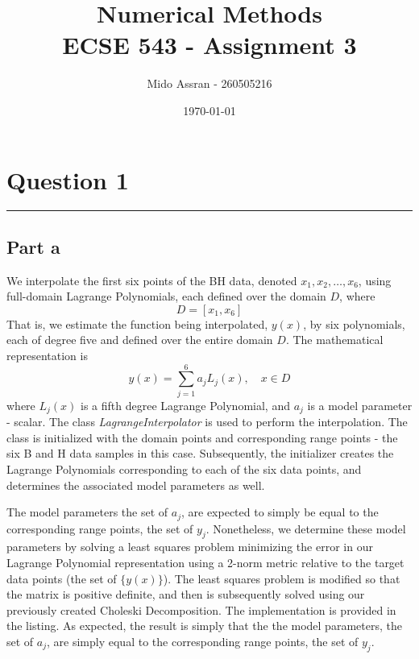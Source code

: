 \documentclass[11pt]{article}
\title{Numerical Methods\\[0.1in] ECSE 543 - Assignment 3}
\author{Mido Assran - 260505216}
\date{\today}
\begin{document}
\maketitle

\section*{Question 1}
\vspace*{-0.1in}
\noindent\rule{\textwidth}{0.4pt}

\subsection*{Part a}
We interpolate the first six points of the BH data, denoted $x_1, x_2, \ldots, x_6$, using full-domain Lagrange Polynomials, each defined over the domain $D$, where
$$
D = [x_1, x_6]
$$
That is, we estimate the function being interpolated, $y(x)$, by six polynomials, each of degree five and defined over the entire domain $D$. The mathematical representation is
\begin{equation}
    \label{eq:lagrange_polynomial}
    y(x) = \sum^6_{j=1} a_j L_j(x), \quad x \in D
\end{equation}
where $L_j(x)$ is a fifth degree Lagrange Polynomial, and $a_j$ is a model parameter - scalar. The class \textit{LagrangeInterpolator} is used to perform the interpolation. The class is initialized with the domain points and corresponding range points - the six B and H data samples in this case. Subsequently, the initializer creates the Lagrange Polynomials corresponding to each of the six data points, and determines the associated model parameters as well.

The model parameters the set of $a_j$, are expected to simply be equal to the corresponding range points, the set of $y_j$. Nonetheless, we determine these model parameters by solving a least squares problem minimizing the error in our Lagrange Polynomial representation using a 2-norm metric relative to the target data points (the set of $\{y(x)\}$). The least squares problem is modified so that the matrix is positive definite, and then is subsequently solved using our previously created Choleski Decomposition. The implementation is provided in the listing. As expected, the result is simply that the the model parameters, the set of $a_j$, are simply equal to the corresponding range points, the set of $y_j$.
\end{document}
